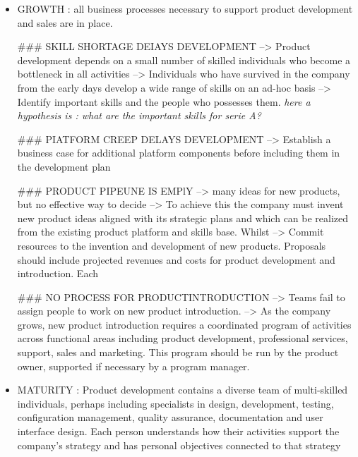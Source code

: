 \begin{itemize}
\begin{itemize}
  \item GROWTH : all business processes necessary to support product development and sales are in place.

  ### SKILL SHORTAGE DEIAYS DEVELOPMENT
  --> Product development depends on a small number of skilled individuals who become a bottleneck in all activities
  --> Individuals who have survived in the company from the early days develop a wide range of skills on an ad-hoc basis
  --> Identify important skills and the people who possesses them. \textit{here a hypothesis is : what are the important skills for serie A?}

  ### PIATFORM CREEP DELAYS DEVELOPMENT
  --> Establish a business case for additional platform components before including them in the development plan

  ### PRODUCT PIPEUNE IS EMPlY
  --> many ideas for new products, but no effective way to decide
  --> To achieve this the company must invent new product ideas aligned with its strategic plans and which can be realized from the existing product platform and skills base. Whilst
  --> Commit resources to the invention and development of new products. Proposals should include projected revenues and costs for product development and introduction. Each

  ### NO PROCESS FOR PRODUCTINTRODUCTION
  --> Teams fail to assign people to work on new product introduction.
  --> As the company grows, new product introduction requires a coordinated program of activities across functional areas including product development, professional services, support, sales and marketing. This program should be run by the product owner, supported if necessary by a program manager.

  \item MATURITY : Product development contains a diverse team of multi-skilled individuals, perhaps including specialists in design, development, testing, configuration management, quality assurance, documentation and user interface design. Each person understands how their activities support the company's strategy and has personal objectives connected to that strategy


\end{itemize}
\end{itemize}
